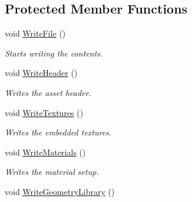 \subsection*{Protected Member Functions}
\begin{DoxyCompactItemize}
\item 
\hypertarget{class_assimp_1_1_collada_exporter_a03044e96722b7ec8dcd295253176fc18}{void \hyperlink{class_assimp_1_1_collada_exporter_a03044e96722b7ec8dcd295253176fc18}{Write\+File} ()}\label{class_assimp_1_1_collada_exporter_a03044e96722b7ec8dcd295253176fc18}

\begin{DoxyCompactList}\small\item\em Starts writing the contents. \end{DoxyCompactList}\item 
\hypertarget{class_assimp_1_1_collada_exporter_a889039977e63701162661124b0fb0f7f}{void \hyperlink{class_assimp_1_1_collada_exporter_a889039977e63701162661124b0fb0f7f}{Write\+Header} ()}\label{class_assimp_1_1_collada_exporter_a889039977e63701162661124b0fb0f7f}

\begin{DoxyCompactList}\small\item\em Writes the asset header. \end{DoxyCompactList}\item 
\hypertarget{class_assimp_1_1_collada_exporter_ae64bb9a3e3ecd33275fa003079858bab}{void \hyperlink{class_assimp_1_1_collada_exporter_ae64bb9a3e3ecd33275fa003079858bab}{Write\+Textures} ()}\label{class_assimp_1_1_collada_exporter_ae64bb9a3e3ecd33275fa003079858bab}

\begin{DoxyCompactList}\small\item\em Writes the embedded textures. \end{DoxyCompactList}\item 
void \hyperlink{class_assimp_1_1_collada_exporter_a357ea705b73f3015847d0d71c91f4bfa}{Write\+Materials} ()
\begin{DoxyCompactList}\small\item\em Writes the material setup. \end{DoxyCompactList}\item 
\hypertarget{class_assimp_1_1_collada_exporter_abe01453a8e4b71341bda65ffe2971d2f}{void \hyperlink{class_assimp_1_1_collada_exporter_abe01453a8e4b71341bda65ffe2971d2f}{Write\+Geometry\+Library} ()}\label{class_assimp_1_1_collada_exporter_abe01453a8e4b71341bda65ffe2971d2f}


\end{DoxyCompactItemize}
